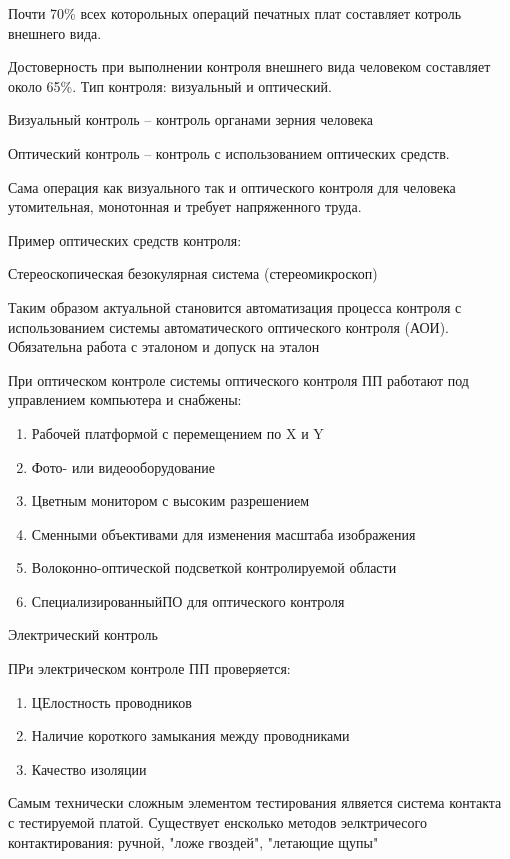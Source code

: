 \documentclass{article}
\begin{document}
Почти 70\% всех которольных операций печатных плат составляет котроль внешнего вида.

Достоверность при выполнении контроля внешнего вида человеком составляет около 65\%. Тип контроля: визуальный и оптический.

Визуальный контроль -- контроль органами зерния человека

Оптический контроль -- контроль с использованием оптических средств.

Сама операция как визуального так и оптического контроля для человека утомительная, монотонная и требует напряженного труда.

Пример оптических средств контроля:

Стереоскопическая безокулярная система (стереомикроскоп)


Таким образом актуальной становится автоматизация процесса контроля с использованием системы автоматического оптического контроля (АОИ). Обязательна работа с эталоном и допуск на эталон

При оптическом контроле системы оптического контроля ПП работают под управлением компьютера и снабжены:
\begin{enumerate}
	\item Рабочей платформой с перемещением по X и Y
	\item Фото- или видеооборудование
	\item Цветным монитором с высоким разрешением
	\item Сменными объективами для изменения масштаба изображения
	\item Волоконно-оптической подсветкой контролируемой области
	\item СпециализированныйПО для оптического контроля
\end{enumerate}

Электрический контроль

ПРи электрическом контроле ПП проверяется:
\begin{enumerate}
	\item ЦЕлостность проводников
	\item Наличие короткого замыкания между проводниками
	\item Качество изоляции
\end{enumerate}

Самым технически сложным элементом тестирования ялвяется система контакта с тестируемой платой. Существует енсколько методов эелктричесого контактирования: ручной, "ложе гвоздей", "летающие щупы"
\end{document}
